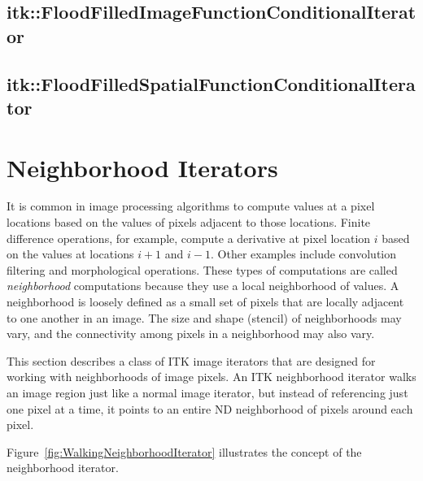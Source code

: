 \subsection{itk::FloodFilledImageFunctionConditionalIterator}
\label{itk::FloodFilledImageFunctionConditionalIterator}

\subsection{itk::FloodFilledSpatialFunctionConditionalIterator}
\label{itk::FloodFilledSpatialFunctionConditionalIterator}

\section{Neighborhood Iterators}
\label{sec:NeighborhoodIterators}

It is common in image processing algorithms to compute  values at a pixel
locations based on the values of pixels adjacent to those locations.  Finite
difference operations, for example, compute a derivative at pixel location $i$
based on the values at locations $i+1$ and $i-1$. Other examples include
convolution filtering and morphological operations.  These types of
computations are called \emph{neighborhood} computations because they use a local
neighborhood of values.  A neighborhood is loosely defined as a small set of pixels
that are locally adjacent to one another in an image.  The size and shape
(stencil) of neighborhoods may vary, and the connectivity among pixels in a
neighborhood may also vary.

This section describes a class of ITK image iterators that are designed for
working with neighborhoods of image pixels. An ITK neighborhood iterator walks
an image region just like a normal image iterator, but instead of referencing
just one pixel at a time, it points to an entire ND neighborhood of pixels
around each pixel. 

Figure~\ref{fig:WalkingNeighborhoodIterator} illustrates the concept of the
neighborhood iterator.
%
%

